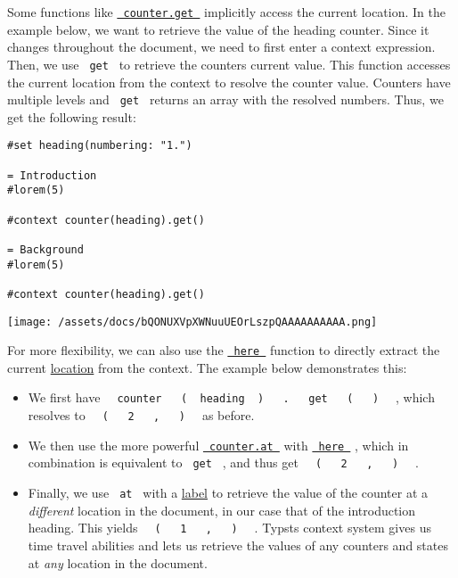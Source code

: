 Some functions like
\href{/docs/reference/introspection/counter/\#definitions-get}{\texttt{\ counter.get\ }}
implicitly access the current location. In the example below, we want to
retrieve the value of the heading counter. Since it changes throughout
the document, we need to first enter a context expression. Then, we use
\texttt{\ get\ } to retrieve the counter\textquotesingle s current
value. This function accesses the current location from the context to
resolve the counter value. Counters have multiple levels and
\texttt{\ get\ } returns an array with the resolved numbers. Thus, we
get the following result:

\begin{verbatim}
#set heading(numbering: "1.")

= Introduction
#lorem(5)

#context counter(heading).get()

= Background
#lorem(5)

#context counter(heading).get()
\end{verbatim}

\texttt{[image: /assets/docs/bQONUXVpXWNuuUEOrLszpQAAAAAAAAAA.png]}

For more flexibility, we can also use the
\href{/docs/reference/introspection/here/}{\texttt{\ here\ }} function
to directly extract the current
\href{/docs/reference/introspection/location/}{location} from the
context. The example below demonstrates this:

\begin{itemize}
\tightlist
\item
  We first have
  \texttt{\ }{\texttt{\ counter\ }}\texttt{\ }{\texttt{\ (\ }}\texttt{\ heading\ }{\texttt{\ )\ }}\texttt{\ }{\texttt{\ .\ }}\texttt{\ }{\texttt{\ get\ }}\texttt{\ }{\texttt{\ (\ }}\texttt{\ }{\texttt{\ )\ }}\texttt{\ }
  , which resolves to
  \texttt{\ }{\texttt{\ (\ }}\texttt{\ }{\texttt{\ 2\ }}\texttt{\ }{\texttt{\ ,\ }}\texttt{\ }{\texttt{\ )\ }}\texttt{\ }
  as before.
\item
  We then use the more powerful
  \href{/docs/reference/introspection/counter/\#definitions-at}{\texttt{\ counter.at\ }}
  with \href{/docs/reference/introspection/here/}{\texttt{\ here\ }} ,
  which in combination is equivalent to \texttt{\ get\ } , and thus get
  \texttt{\ }{\texttt{\ (\ }}\texttt{\ }{\texttt{\ 2\ }}\texttt{\ }{\texttt{\ ,\ }}\texttt{\ }{\texttt{\ )\ }}\texttt{\ }
  .
\item
  Finally, we use \texttt{\ at\ } with a
  \href{/docs/reference/foundations/label/}{label} to retrieve the value
  of the counter at a \emph{different} location in the document, in our
  case that of the introduction heading. This yields
  \texttt{\ }{\texttt{\ (\ }}\texttt{\ }{\texttt{\ 1\ }}\texttt{\ }{\texttt{\ ,\ }}\texttt{\ }{\texttt{\ )\ }}\texttt{\ }
  . Typst\textquotesingle s context system gives us time travel
  abilities and lets us retrieve the values of any counters and states
  at \emph{any} location in the document.
\end{itemize}

